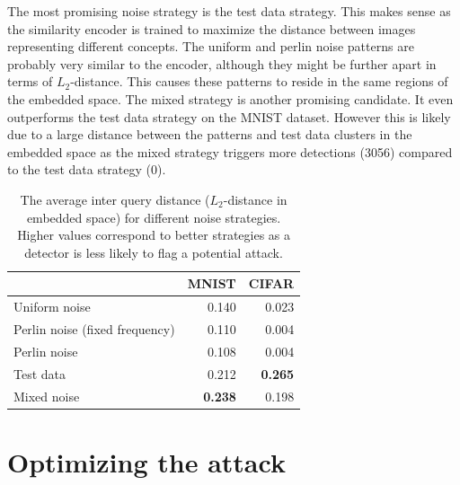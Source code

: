 The most promising noise strategy is the test data strategy. This makes sense as the similarity encoder is trained to maximize the distance between images representing different concepts. The uniform and perlin noise patterns are probably very similar to the encoder, although they might be further apart in terms of $L_2$-distance. This causes these patterns to reside in the same regions of the embedded space. The mixed strategy is another promising candidate. It even outperforms the test data strategy on the MNIST dataset. However this is likely due to a large distance between the patterns and test data clusters in the embedded space as the mixed strategy triggers more detections (3056) compared to the test data strategy (0). 

\begin{table}
\centering
\caption[The average inter query distances for different types of noise]{The average inter query distance ($L_2$-distance in embedded space) for different noise strategies. Higher values correspond to better strategies as a detector is less likely to flag a potential attack.}
\label{tbl:noise_distances}
\begin{tabular}{lrr}\toprule
	&MNIST &CIFAR \\ \midrule
Uniform noise&0.140&0.023\\ 
Perlin noise (fixed frequency)&0.110&0.004\\ 
Perlin noise&0.108&0.004\\ 
Test data&0.212&\textbf{0.265}\\ 
Mixed noise&\textbf{0.238}&0.198\\ \bottomrule

\end{tabular}
\end{table}

\section{Optimizing the attack}
